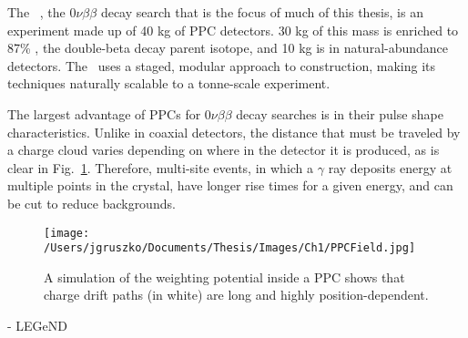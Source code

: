 The \MJ~\MJDemo, the $0\nu\beta\beta$ decay search that is the focus of much of this thesis, is an experiment made up of 40 kg of PPC detectors. 30 kg of this mass is enriched to 87\% , the double-beta decay parent isotope, and 10 kg is in natural-abundance detectors. The \MJDemo~uses a staged, modular approach to construction, making its techniques naturally scalable to a tonne-scale experiment. 

The largest advantage of PPCs for $0\nu\beta\beta$ decay searches is in their pulse shape characteristics. Unlike in coaxial detectors, the distance that must be traveled by a charge cloud varies depending on where in the detector it is produced, as is clear in Fig.~\ref{PPCField}. Therefore, multi-site events, in which a $\gamma$ ray deposits energy at multiple points in the crystal, have longer rise times for a given energy, and can be cut to reduce backgrounds. 

\begin{figure}[h]
\hfil \texttt{[image: /Users/jgruszko/Documents/Thesis/Images/Ch1/PPCField.jpg]} \hfil
\caption{A simulation of the weighting potential inside a PPC shows that charge drift paths (in white) are long and highly position-dependent. \cite{Aalseth2011}}
\label{PPCField}
\end{figure}

	- LEGeND

